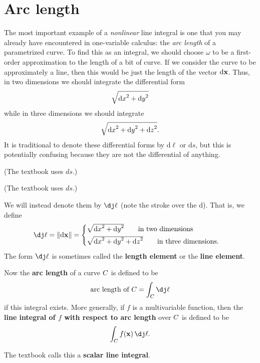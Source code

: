 \documentclass[12pt]{amsart}
\begin{document}
\section{Arc length}
\label{sec:arc-length}

The most important example of a \emph{nonlinear} line integral is one that you may already have encountered in one-variable calculus: the \emph{arc length} of a parametrized curve.
To find this as an integral, we should choose $\omega$ to be a first-order approximation to the length of a bit of curve.
If we consider the curve to be approximately a line, then this would be just the length of the vector ${\mathrm{d} \mathbf{x}}$.
Thus, in two dimensions we should integrate the differential form
\[ \sqrt{{\mathrm{d} x}^2+{\mathrm{d} y}^2}\]
while in three dimensions we should integrate
\[ \sqrt{{\mathrm{d} x}^2+{\mathrm{d} y}^2 + {\mathrm{d} z}^2}.\]
It is traditional to denote these differential forms by $\mathrm{d}\ell$ or $\mathrm{d}s$, but this is potentially confusing because they are not the differential of anything.
\begin{stewart}(The textbook uses $ds$.)\end{stewart}%
\begin{rogawski}(The textbook uses $ds$.)\end{rogawski}
We will instead denote them by $\dl$ (note the stroke over the $\mathrm{d}$).
That is, we define
\[ \dl = \mgn{\dpx} =
\begin{cases}
  \sqrt{\dx^2+\dy^2}\qquad\text{in two dimensions}\\[3pt]
  \sqrt{\dx^2+\dy^2+\dz^2}\qquad\text{in three dimensions}.
\end{cases}\]
The form $\dl$ is sometimes called the \textbf{length element} or the \textbf{line element}.

Now the \textbf{arc length} of a curve $C$ is defined to be
\[ \text{arc length of } \curve = \lint{\curve} \dl \]
if this integral exists.
More generally, if $f$ is a multivariable function, then the \textbf{line integral of $f$ with respect to arc length} over $C$ is defined to be
\[ \lint{\curve} f(\ptx)\,\dl. \]
\begin{rogawski}The textbook calls this a \textbf{scalar line integral}.\end{rogawski}
\end{document}
